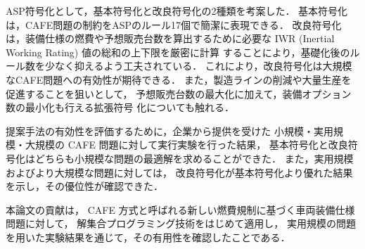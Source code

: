 ASP符号化として，基本符号化と改良符号化の2種類を考案した．
基本符号化は，CAFE問題の制約をASPのルール17個で簡潔に表現できる．
改良符号化は，装備仕様の燃費や予想販売台数を算出するために必要な
IWR (Inertial Working Rating) 値の総和の上下限を厳密に計算
することにより，基礎化後のルール数を少なく抑えるよう工夫されている．
これにより，改良符号化は大規模なCAFE問題への有効性が期待できる．
また，製造ラインの削減や大量生産を促進することを狙いとして，
予想販売台数の最大化に加えて，装備オプション数の最小化も行える拡張符号
化についても触れる．

提案手法の有効性を評価するために，企業から提供を受けた
小規模・実用規模・大規模の CAFE 問題に対して実行実験を行った結果，
基本符号化と改良符号化はどちらも小規模な問題の最適解を求めることができた．
また，実用規模およびより大規模な問題に対しては，
改良符号化が基本符号化より優れた結果を示し，その優位性が確認できた．

本論文の貢献は，
CAFE 方式と呼ばれる新しい燃費規制に基づく車両装備仕様問題に対して，
解集合プログラミング技術をはじめて適用し，
実用規模の問題を用いた実験結果を通じて，その有用性を確認したことである．

